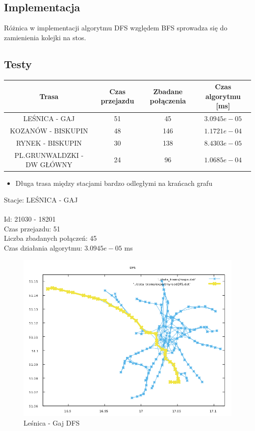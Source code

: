 \documentclass[13pt]{article}
\begin{document}
\subsection{Implementacja}
Różnica w implementacji algorytmu DFS względem BFS sprowadza się do zamienienia kolejki na stos.


\subsection{Testy}
\begin{tabular}{|c|c|c|c|} \hline
Trasa & Czas przejazdu  & Zbadane połączenia & Czas algorytmu [ms]\\
\hline \hline
 LEŚNICA - GAJ & 51 & 45 &  $3.0945e-05$ \\
 \hline
 KOZANÓW - BISKUPIN & 48 & 146 &  $1.1721e-04$ \\
 \hline
 RYNEK - BISKUPIN & 30 & 138 & $8.4303e-05$ \\
 \hline
 PL.GRUNWALDZKI - DW GŁÓWNY & 24 & 96 &   $1.0685e-04$\\
 \hline
\end{tabular}

\newpage

\begin{itemize}
\item Długa trasa między stacjami bardzo odległymi na krańcach grafu
\end{itemize}
\hspace{1.5cm} Stacje: LEŚNICA - GAJ \\\\
Id: 21030   - 18201\\
Czas przejazdu: 51\\
Liczba zbadanych połączeń: 45\\
Czas działania algorytmu: $3.0945e-05$ ms
\begin{figure}[hp]
\centering
\includegraphics[width=1\textwidth]{wykresy/LES_GAJ_DFS.png}
\caption{Leśnica - Gaj DFS}
\end{figure}
\end{document}
